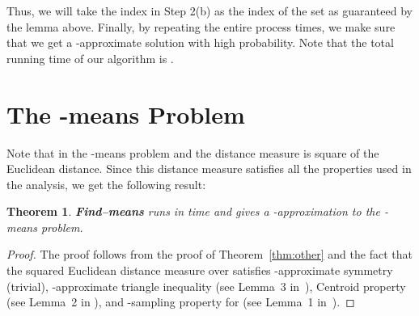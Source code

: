 \documentclass[11pt]{article}
\newtheorem{theorem}{Theorem}
\begin{document}
Thus, we will take the index  in Step 2(b) as the index of the set  as guaranteed by the lemma above.
Finally, by repeating the entire process  times, we make sure that we get a -approximate solution
with high probability.
Note that the total running time of our algorithm is .





\section{The -means Problem}\label{sec:k-means}

Note that in the -means problem  and the distance measure  is square of the Euclidean distance. 
Since this distance measure satisfies all the properties used in the analysis, we get the following result:

\begin{theorem}
{\bf Find--means} runs in time  and gives a -approximation to the -means problem.
\end{theorem}
\begin{proof}
The proof follows from the proof of Theorem~\ref{thm:other} and the fact that the squared Euclidean distance measure over  satisfies -approximate symmetry (trivial), -approximate triangle inequality (see Lemma~3 in~\cite{jks12}), Centroid property (see Lemma~2 in \cite{jks12}), and -sampling property for  (see Lemma~1 in~\cite{jks12}).
\qedhere
\end{proof}


\end{document}
